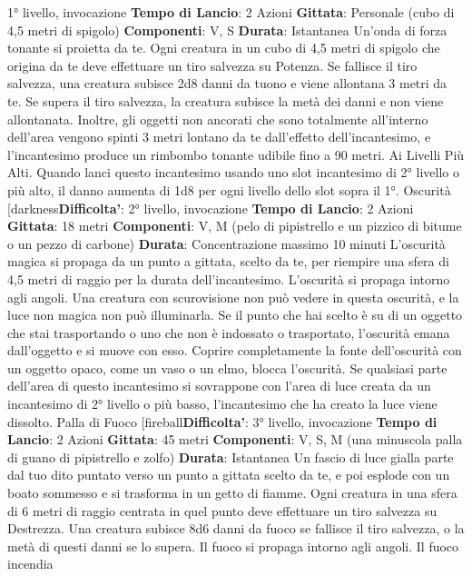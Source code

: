 \begin{multicols}{2}
1° livello, invocazione
\textbf{Tempo di Lancio}: 2 Azioni
\textbf{Gittata}: Personale (cubo di 4,5 metri di spigolo)
\textbf{Componenti}: V, S
\textbf{Durata}: Istantanea
Un’onda di forza tonante si proietta da te. Ogni creatura
in un cubo di 4,5 metri di spigolo che origina da te deve
effettuare un tiro salvezza su Potenza. Se fallisce il
tiro salvezza, una creatura subisce 2d8 danni da tuono
e viene allontana 3 metri da te. Se supera il tiro
salvezza, la creatura subisce la metà dei danni e non
viene allontanata.
Inoltre, gli oggetti non ancorati che sono totalmente
all’interno dell’area vengono spinti 3 metri lontano da te
dall’effetto dell’incantesimo, e l’incantesimo produce un
rimbombo tonante udibile fino a 90 metri.
Ai Livelli Più Alti. Quando lanci questo incantesimo
usando uno slot incantesimo di 2° livello o più alto, il
danno aumenta di 1d8 per ogni livello dello slot sopra il
1°.
Oscurità
[darkness\textbf{Difficolta'}:
2° livello, invocazione
\textbf{Tempo di Lancio}: 2 Azioni
\textbf{Gittata}: 18 metri
\textbf{Componenti}: V, M (pelo di pipistrello e un pizzico di
bitume o un pezzo di carbone)
\textbf{Durata}: Concentrazione massimo 10 minuti
L’oscurità magica si propaga da un punto a gittata,
scelto da te, per riempire una sfera di 4,5 metri di raggio
per la durata dell’incantesimo. L’oscurità si propaga
intorno agli angoli. Una creatura con scurovisione non
può vedere in questa oscurità, e la luce non magica non
può illuminarla.
Se il punto che hai scelto è su di un oggetto che stai
trasportando o uno che non è indossato o trasportato,
l’oscurità emana dall’oggetto e si muove con esso.
Coprire completamente la fonte dell’oscurità con un
oggetto opaco, come un vaso o un elmo, blocca
l’oscurità.
Se qualsiasi parte dell’area di questo incantesimo si
sovrappone con l’area di luce creata da un incantesimo
di 2° livello o più basso, l’incantesimo che ha creato la
luce viene dissolto.
Palla di Fuoco
[fireball\textbf{Difficolta'}:
3° livello, invocazione
\textbf{Tempo di Lancio}: 2 Azioni
\textbf{Gittata}: 45 metri
\textbf{Componenti}: V, S, M (una minuscola palla di guano di
pipistrello e zolfo)
\textbf{Durata}: Istantanea
Un fascio di luce gialla parte dal tuo dito puntato verso
un punto a gittata scelto da te, e poi esplode con un
boato sommesso e si trasforma in un getto di fiamme.
Ogni creatura in una sfera di 6 metri di raggio centrata
in quel punto deve effettuare un tiro salvezza su
Destrezza. Una creatura subisce 8d6 danni da fuoco se
fallisce il tiro salvezza, o la metà di questi danni se lo
supera.
Il fuoco si propaga intorno agli angoli. Il fuoco incendia

\end{multicols}
